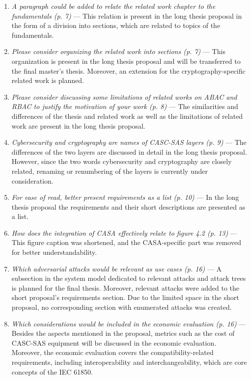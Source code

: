 \begin{enumerate}[label=R\arabic*.]
\begin{enumerate}[label=Q\arabic*.]
        \item \textit{A paragraph could be added to relate the related work chapter to the fundamentals (p. 7)} --- This relation is present in the long thesis proposal in the form of a division into sections, which are related to topics of the fundamentals.
        \item \textit{Please consider organizing the related work into sections (p. 7)} --- This organization is present in the long thesis proposal and will be transferred to the final master's thesis. Moreover, an extension for the cryptography-specific related work is planned.
        \item \textit{Please consider discussing some limitations of related works on ABAC and RBAC to justify the motivation of your work (p. 8)} --- The similarities and differences of the thesis and related work as well as the limitations of related work are present in the long thesis proposal.
        \item \textit{Cybersecurity and cryptography are names of CASC-SAS layers (p. 9)} --- The differences of the two layers are discussed in detail in the long thesis proposal. However, since the two words cybersecurity and cryptography are closely related, renaming or renumbering of the layers is currently under consideration.
        \item \textit{For ease of read, better present requirements as a list (p. 10)} --- In the long thesis proposal the requirements and their short descriptions are presented as a list.
        \item \textit{How does the integration of CASA effectively relate to figure 4.2 (p. 13)} --- This figure caption was shortened, and the CASA-specific part was removed for better understandability.
        \item \textit{Which adversarial attacks would be relevant as use cases (p. 16)} --- A subsection in the system model dedicated to relevant attacks and attack trees is planned for the final thesis. Moreover, relevant attacks were added to the short proposal's requirements section. Due to the limited space in the short proposal, no corresponding section with enumerated attacks was created.
        \item \textit{Which considerations would be included in the economic evaluation (p. 16)} --- Besides the aspects mentioned in the proposal, metrics such as the cost of CASC-SAS equipment will be discussed in the economic evaluation. Moreover, the economic evaluation covers the compatibility-related requirements, including interoperability and interchangeability, which are core concepts of the IEC 61850.

\end{enumerate}
\end{enumerate}

